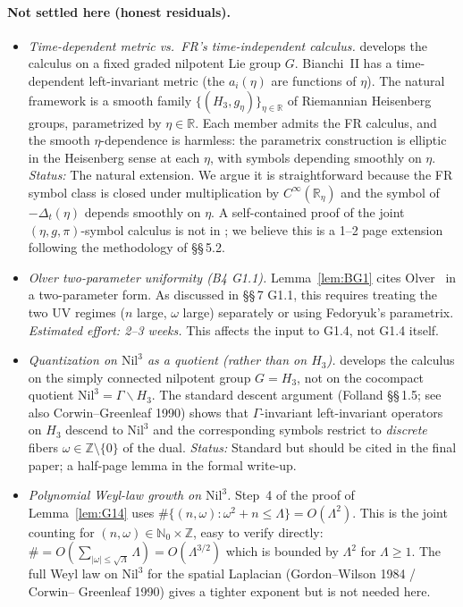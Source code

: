 \documentclass[11pt, a4paper]{article}
\newcommand{\RR}{\mathbb{R}}
\newcommand{\ZZ}{\mathbb{Z}}
\newcommand{\NN}{\mathbb{N}}
\newcommand{\Hgroup}{H_3}
\newcommand{\Nil}{\mathrm{Nil}^3}
\newcommand{\om}{\omega}
\newcommand{\Lam}{\Lambda}
\begin{document}
\paragraph{Not settled here (honest residuals).}
\begin{itemize}[leftmargin=*,nosep]
  \item[\textbf{R1.}]
        \emph{Time-dependent metric vs.\ FR's time-independent calculus.}
        \cite{FR16} develops the calculus on a fixed graded nilpotent Lie
        group $G$. Bianchi~II has a time-dependent left-invariant metric
        (the $a_i(\eta)$ are functions of $\eta$). The natural framework is
        a smooth family $\{(\Hgroup,g_\eta)\}_{\eta\in\RR}$ of Riemannian
        Heisenberg groups, parametrized by $\eta\in\RR$. Each member admits
        the FR calculus, and the smooth $\eta$-dependence is harmless:
        the parametrix construction is elliptic in the Heisenberg sense at
        each $\eta$, with symbols depending smoothly on $\eta$.
        \emph{Status:} The natural extension. We argue it is straightforward
        because the FR symbol class is closed under multiplication by
        $C^\infty(\RR_\eta)$ and the symbol of $-\Delta_t(\eta)$ depends
        smoothly on $\eta$. A self-contained proof of the joint
        $(\eta,g,\pi)$-symbol calculus is not in \cite{FR16}; we believe
        this is a 1--2 page extension following the methodology of
        \cite{FR16} \S\S\,5.2.
  \item[\textbf{R2.}]
        \emph{Olver two-parameter uniformity (B4 G1.1).}
        Lemma~\ref{lem:BG1} cites Olver~\cite{Olver74} in a two-parameter
        form. As discussed in \cite{LemmaBG1} \S\S\,7 G1.1, this requires
        treating the two UV regimes ($n$ large, $\om$ large) separately
        or using Fedoryuk's parametrix. \emph{Estimated effort: 2--3 weeks.}
        This affects the input to G1.4, not G1.4 itself.
  \item[\textbf{R3.}]
        \emph{Quantization on $\Nil$ as a quotient (rather than on $\Hgroup$).}
        \cite{FR16} develops the calculus on the simply connected nilpotent
        group $G=\Hgroup$, not on the cocompact quotient
        $\Nil=\Gamma\backslash\Hgroup$. The standard descent argument
        (Folland \cite{Folland1989} \S\S\,1.5; see also Corwin--Greenleaf 1990)
        shows that $\Gamma$-invariant left-invariant operators on $\Hgroup$
        descend to $\Nil$ and the corresponding symbols restrict to
        \emph{discrete} fibers $\om\in\ZZ\setminus\{0\}$ of the dual.
        \emph{Status:} Standard but should be cited in the final paper;
        a half-page lemma in the formal write-up.
  \item[\textbf{R4.}]
        \emph{Polynomial Weyl-law growth on $\Nil$.}
        Step~4 of the proof of Lemma~\ref{lem:G14} uses
        $\#\{(n,\om):\om^2+n\le\Lam\}=O(\Lam^2)$. This is the joint counting
        for $(n,\om)\in\NN_0\times\ZZ$, easy to verify directly:
        $\#=O(\sum_{|\om|\le\sqrt\Lam}\Lam) = O(\Lam^{3/2})$
        which is bounded by $\Lam^2$ for $\Lam\ge 1$. The full Weyl law on
        $\Nil$ for the spatial Laplacian (Gordon--Wilson 1984 / Corwin--
        Greenleaf 1990) gives a tighter exponent but is not needed here.
\end{itemize}
\end{document}
